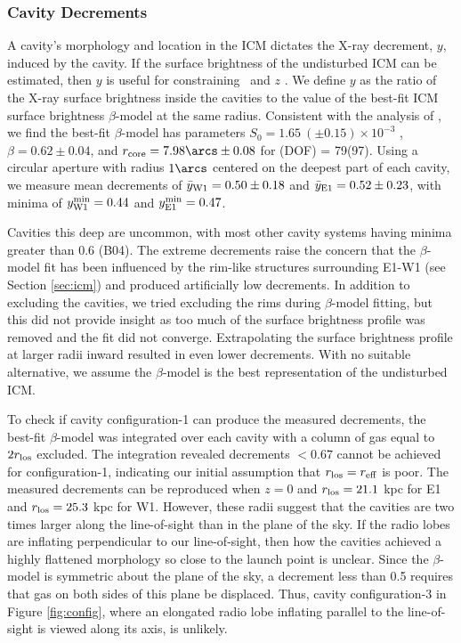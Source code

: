 \documentclass[11pt, preprint]{aastex}
\begin{document}
\subsubsection{Cavity Decrements}
\label{sec:dec}

A cavity's morphology and location in the ICM dictates the X-ray
decrement, $y$, induced by the cavity. If the surface brightness of
the undisturbed ICM can be estimated, then $y$ is useful for
constraining \rlos\ and $z$ \citep[see][for details]{hydraa}. We
define $y$ as the ratio of the X-ray surface brightness inside the
cavities to the value of the best-fit ICM surface brightness
$\beta$-model at the same radius. Consistent with the analysis of
\citet{schindler01}, we find the best-fit $\beta$-model has parameters
$S_0 = 1.65 ~(\pm 0.15) \times 10^{-3}$ \sbr, $\beta = 0.62 \pm 0.04$,
and $r_{\rm{core}} = 7.98\arcs \pm 0.08$ for \chisq(DOF) =
79(97). Using a circular aperture with radius $1\arcs$ centered on the
deepest part of each cavity, we measure mean decrements of
$\bar{y}_{\rm{W1}} = 0.50 \pm 0.18$ and $\bar{y}_{\rm{E1}} = 0.52 \pm
0.23$, with minima of $y^{\rm{min}}_{\rm{W1}} = 0.44$ and
$y^{\rm{min}}_{\rm{E1}} = 0.47$.

Cavities this deep are uncommon, with most other cavity systems having
minima greater than 0.6 (B04). The extreme decrements raise the
concern that the $\beta$-model fit has been influenced by the rim-like
structures surrounding E1-W1 (see Section \ref{sec:icm}) and produced
artificially low decrements. In addition to excluding the cavities, we
tried excluding the rims during $\beta$-model fitting, but this did
not provide insight as too much of the surface brightness profile was
removed and the fit did not converge. Extrapolating the surface
brightness profile at larger radii inward resulted in even lower
decrements. With no suitable alternative, we assume the $\beta$-model
is the best representation of the undisturbed ICM.

To check if cavity configuration-1 can produce the measured
decrements, the best-fit $\beta$-model was integrated over each cavity
with a column of gas equal to $2r_{\rm{los}}$ excluded. The integration
revealed decrements $< 0.67$ cannot be achieved for configuration-1,
indicating our initial assumption that $r_{\rm{los}} = r_{\rm{eff}}$ is poor. The
measured decrements can be reproduced when $z = 0$ and $r_{\rm{los}} = 21.1$
kpc for E1 and $r_{\rm{los}} = 25.3$ kpc for W1. However, these radii suggest
that the cavities are two times larger along the line-of-sight than in
the plane of the sky. If the radio lobes are inflating perpendicular
to our line-of-sight, then how the cavities achieved a highly flattened
morphology so close to the launch point is unclear. Since the
$\beta$-model is symmetric about the plane of the sky, a decrement
less than 0.5 requires that gas on both sides of this plane be
displaced. Thus, cavity configuration-3 in Figure \ref{fig:config},
where an elongated radio lobe inflating parallel to the line-of-sight
is viewed along its axis, is unlikely.
\end{document}
